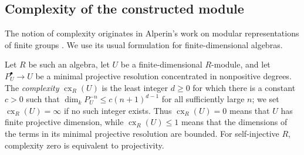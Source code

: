 \documentclass[11pt]{article}
\begin{document}
\subsection{Complexity of the constructed module}
\label{general:complexity-section}

The notion of complexity originates in Alperin's work on modular
representations of finite groups \cite{Alperin}. We use its usual
formulation for finite-dimensional algebras.

Let $R$ be such an algebra,
let $U$ be a finite-dimensional $R$-module, and let $P_U^\bullet\to U$
be a minimal projective resolution concentrated in nonpositive degrees.
The \emph{complexity} $\operatorname{cx}_R(U)$ is the least integer
$d\ge0$ for which there is a constant $c>0$ such that
$\dim_kP_U^{-n}\le c(n+1)^{d-1}$ for all sufficiently large $n$;
we set $\operatorname{cx}_R(U)=\infty$ if no such integer exists.
Thus $\operatorname{cx}_R(U)=0$ means that $U$ has finite projective
dimension, while $\operatorname{cx}_R(U)\le1$ means that the dimensions
of the terms in its minimal projective resolution are bounded.
For self-injective $R$, complexity zero is equivalent to projectivity.
\end{document}
